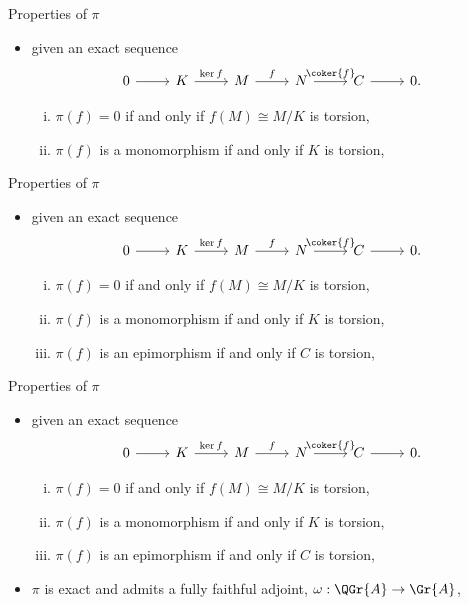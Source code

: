 \documentclass{beamer}
\theoremstyle{definition}
\begin{document}
\begin{frame}[fragile]{Properties of $\pi$}
  \begin{itemize}
  \item
    given an exact sequence
    $$\begin{tikzcd}
      0 \arrow{r} & K \arrow{r}{\ker{f}} & M \arrow{r}{f} & N \arrow{r}{\coker{f}} & C \arrow{r} & 0.
    \end{tikzcd}$$
    \begin{enumerate}[(i)]
    \item
      $\pi(f) = 0$ if and only if $f(M) \cong M/K$ is torsion,
    \item
      $\pi(f)$ is a monomorphism if and only if $K$ is torsion, 
    \end{enumerate}
  \end{itemize}
\end{frame}

\begin{frame}[fragile]{Properties of $\pi$}
  \begin{itemize}
  \item
    given an exact sequence
    $$\begin{tikzcd}
      0 \arrow{r} & K \arrow{r}{\ker{f}} & M \arrow{r}{f} & N \arrow{r}{\coker{f}} & C \arrow{r} & 0.
    \end{tikzcd}$$
    \begin{enumerate}[(i)]
    \item
      $\pi(f) = 0$ if and only if $f(M) \cong M/K$ is torsion,
    \item
      $\pi(f)$ is a monomorphism if and only if $K$ is torsion, 
    \item
      $\pi(f)$ is an epimorphism if and only if $C$ is torsion,
    \end{enumerate}
  \end{itemize}
\end{frame}

\begin{frame}[fragile]{Properties of $\pi$}
  \begin{itemize}
  \item
    given an exact sequence
    $$\begin{tikzcd}
      0 \arrow{r} & K \arrow{r}{\ker{f}} & M \arrow{r}{f} & N \arrow{r}{\coker{f}} & C \arrow{r} & 0.
    \end{tikzcd}$$
    \begin{enumerate}[(i)]
    \item
      $\pi(f) = 0$ if and only if $f(M) \cong M/K$ is torsion,
    \item
      $\pi(f)$ is a monomorphism if and only if $K$ is torsion, 
    \item
      $\pi(f)$ is an epimorphism if and only if $C$ is torsion,
    \end{enumerate}
  \item
    $\pi$ is exact and admits a fully faithful adjoint, $\omega : \QGr{A} \rightarrow \Gr{A}$,
  \end{itemize}
\end{frame}
\end{document}
